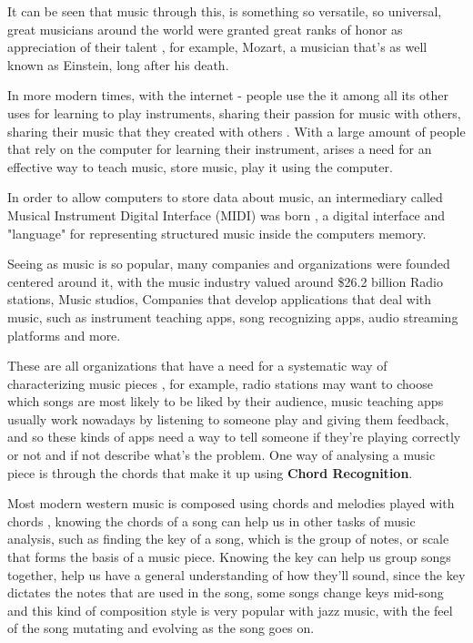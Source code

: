 \documentclass[a4paper]{article}
\begin{document}
It can be seen that music through this, is something so versatile, so universal, great musicians around the world were granted great ranks of honor as appreciation of their talent \citep{music_honor_wiki}, for example, Mozart, a musician that's as well known as Einstein, long after his death.

In more modern times, with the internet - people use the it among all its other uses for learning to play instruments, sharing their passion for music with others, sharing their music that they created with others \cite{internet_music}.
With a large amount of people that rely on the computer for learning their instrument, arises a need for an effective way to teach music, store music, play it using the computer.

In order to allow computers to store data about music, an intermediary called Musical Instrument Digital Interface (MIDI) was born \citep{midi_wiki}, a digital interface and "language" for representing structured music inside the computers memory.

Seeing as music is so popular, many companies and organizations were founded centered around it, with the music industry valued around \$26.2 billion \cite{music_industry_worth}
Radio stations, Music studios, Companies that develop applications that deal with music, such as instrument teaching apps, song recognizing apps, audio streaming platforms and more.

These are all organizations that have a need for a systematic way of characterizing music pieces \citep{music_industry_wiki}, for example, radio stations may want to choose which songs are most likely to be liked by their audience, music teaching apps usually work nowadays by listening to someone play and giving them feedback, and so these kinds of apps need a way to tell someone if they're playing correctly or not and if not describe what's the problem.
One way of analysing a music piece is through the chords that make it up using \textbf{Chord Recognition}.

Most modern western music is composed using chords and melodies played with chords \citep{musictheory_wiki}, knowing the chords of a song can help us in other tasks of music analysis, such as finding the key of a song, which is the group of notes, or scale that forms the basis of a music piece. Knowing the key can help us group songs together, help us have a general understanding of how they'll sound, since the key dictates the notes that are used in the song, some songs change keys mid-song and this kind of composition style is very popular with jazz music, with the feel of the song mutating and evolving as the song goes on.
\end{document}
